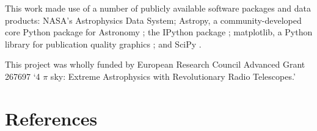 \documentclass[5p,authoryear]{elsarticle}
\begin{document}
This work made use of a number of publicly available software packages and data products: NASA's Astrophysics Data System; Astropy, a community-developed core Python package for Astronomy \citep{Astropy2013}; the IPython package \citep{PER-GRA:2007}; matplotlib, a Python library for publication quality graphics \citep{Hunter2007}; and SciPy \citep{jones_scipy_2001}. 

This project was wholly funded by European Research Council Advanced Grant 267697 
`4 $\pi$ sky: Extreme Astrophysics with Revolutionary Radio Telescopes.’


\section*{References}
% 


\end{document}
